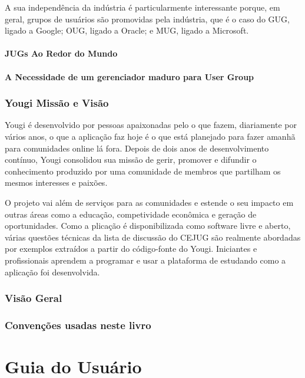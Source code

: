 \documentclass[envcountsame,envcountchap]{svmono}
\begin{document}
A sua independência da indústria é particularmente interessante porque, em geral, grupos de usuários são promovidas pela indústria, que é o caso do GUG, ligado a Google; OUG, ligado a Oracle; e MUG, ligado a Microsoft.

\subsection{JUGs Ao Redor do Mundo}

\subsection{A Necessidade de um gerenciador maduro para User Group}

\section{Yougi Missão e Visão}

Yougi é desenvolvido por pessoas apaixonadas pelo o que fazem, diariamente por vários anos, o que a aplicação faz hoje é o que está planejado para fazer amanhã para comunidades online lá fora. Depois de dois anos de desenvolvimento contínuo, Yougi consolidou sua missão de gerir, promover e difundir o conhecimento produzido por uma comunidade de membros que partilham os mesmos interesses e paixões.

O projeto vai além de serviços para as comunidades e estende o seu impacto em outras áreas como a educação, competividade econômica e geração de oportunidades. Como a plicação é disponibilizada como software livre e aberto, várias questões técnicas da lista de discussão do CEJUG são realmente abordadas por exemplos extraídos a partir do código-fonte do Yougi. Iniciantes e profissionais aprendem a programar e usar a plataforma de estudando como a aplicação foi desenvolvida.

\section{Visão Geral}

\section{Convenções usadas neste livro}

\part{Guia do Usuário}
\end{document}
